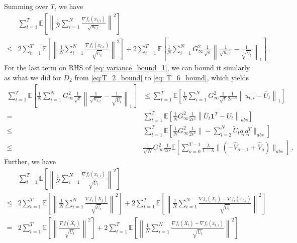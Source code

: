 \documentclass[11pt]{article}
\begin{document}
Summing over $T$, we have
\begin{align}\label{eq: variance_bound_1}
&\sum_{t=1}^T \mathbb E \left[  \left\| \frac{1}{N} \sum_{i=1}^N \frac{\nabla f_i(x_{t,i})}{\sqrt{u_{t,i}}} \right\|^2     \right]   \nonumber \\
\leq & 2\sum_{t=1}^T \mathbb E \left[  \left\|\frac{1}{N} \sum_{i=1}^N \frac{\nabla f_i(x_{t,i})}{\sqrt{\overline U_t}  } \right\|^2 \right] + 2 \sum_{t=1}^T \mathbb E \left[  \frac{1}{N} \sum_{i=1}^N G_{\infty}^2  \frac{1}{\sqrt{\epsilon}}\left\|     \frac{1}{\sqrt{u_{t,i}}} - \frac{1}{\sqrt{\overline U_{t}}}  \right\|_1     \right] \, .
\end{align}
For the last term on RHS of \eqref{eq: variance_bound_1}, we can bound it similarly as what we did for $D_2$ from \eqref{eq:T_2_bound} to \eqref{eq: T_6_bound}, which yields
\begin{align}\label{eq: diff_u}
\sum_{t=1}^T \mathbb E \left[  \frac{1}{N} \sum_{i=1}^N G_{\infty}^2  \frac{1}{\sqrt{\epsilon}}\left\|     \frac{1}{\sqrt{u_{t,i}}} - \frac{1}{\sqrt{\overline U_{t}}}  \right\|_1     \right]&  \leq  \sum_{t=1}^T \mathbb E \left[  \frac{1}{N} \sum_{i=1}^N G_{\infty}^2  \frac{1}{\sqrt{\epsilon}} \frac{1}{2\epsilon^{1.5}} \left\|  u_{t,i} -    \overline U_{t}  \right\|_1     \right] \nonumber \\
=& \sum_{t=1}^T \mathbb E \left[  \frac{1}{N}  G_{\infty}^2 \frac{1}{2\epsilon^2} \left\|     \overline U_{t} \mathbf 1^T - U_{t}  \right\|_{abs}    \right]  \nonumber \\
\leq & \sum_{t=1}^T \mathbb E \left[  \frac{1}{N}  G_{\infty}^2 \frac{1}{2\epsilon^2} \| - \sum_{l=2}^N   \tilde U_t q_l q_l^T \|_{abs}    \right] \nonumber \\ 
\leq & \frac{1}{\sqrt{N}}  G_{\infty}^2 \frac{1}{2\epsilon^2}   \mathbb E \left[   \sum_{o=0}^{T-1} \frac{\lambda}{1-\lambda}     \|    (- \hat V_{o-1} + \hat V_{o} ) \|_{abs}    \right] \, .
\end{align}
Further, we have 
\begin{align}
&\sum_{t=1}^T \mathbb E \left[  \left\|\frac{1}{N} \sum_{i=1}^N \frac{\nabla f_i(x_{t,i})}{\sqrt{\overline U_t}  } \right\|^2 \right]  \nonumber \\
\leq & 2 \sum_{t=1}^T \mathbb E \left[  \left\|\frac{1}{N} \sum_{i=1}^N \frac{\nabla f_i(\overline X_{t})}{\sqrt{\overline U_t}  } \right\|^2 \right] + 2 \sum_{t=1}^T \mathbb E \left[  \left\|\frac{1}{N} \sum_{i=1}^N \frac{\nabla f_i(\overline X_t) - \nabla f_i(x_{t,i})}{\sqrt{\overline U_t}  } \right\|^2 \right] \nonumber \\
= & 2 \sum_{t=1}^T \mathbb E \left[  \left\| \frac{\nabla f(\overline X_{t})}{\sqrt{\overline U_t}  } \right\|^2 \right] + 2 \sum_{t=1}^T \mathbb E \left[  \left\|\frac{1}{N} \sum_{i=1}^N \frac{\nabla f_i(\overline X_t) - \nabla f_i(x_{t,i})}{\sqrt{\overline U_t}  } \right\|^2 \right]  \nonumber
\end{align}
\end{document}
